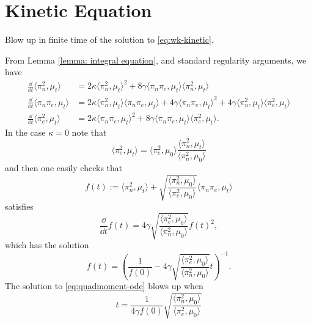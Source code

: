 \section{Kinetic Equation}

Blow up in finite time of the solution to \eqref{eq:wk-kinetic}.

From Lemma \ref{lemma: integral equation}, and standard regularity arguments, we have 
\begin{align}
    \frac{\dd}{\dd t}\langle \pi_n^2, \mu_t\rangle &=
    2\kappa \langle \pi_n^2, \mu_t\rangle^2
    + 8 \gamma \langle \pi_n \pi_e, \mu_t\rangle\langle \pi_n^2, \mu_t\rangle\\
    \frac{\dd}{\dd t}\langle \pi_n \pi_e, \mu_t\rangle &=
    2\kappa \langle \pi_n^2, \mu_t\rangle \langle \pi_n \pi_e, \mu_t\rangle
    + 4 \gamma \langle \pi_n \pi_e, \mu_t\rangle^2
    + 4 \gamma \langle \pi_n^2, \mu_t\rangle\langle \pi_e^2, \mu_t\rangle\\
    \frac{\dd}{\dd t}\langle \pi_e^2, \mu_t\rangle &=
    2\kappa \langle \pi_n \pi_e, \mu_t\rangle^2
    + 8 \gamma \langle \pi_n \pi_e, \mu_t\rangle\langle \pi_e^2, \mu_t\rangle.
\end{align}
In the case $\kappa = 0$ note that
\begin{equation}\label{eq:proportional}
    \langle \pi_e^2, \mu_t\rangle = \langle \pi_e^2, \mu_0\rangle
    \frac{\langle \pi_n^2, \mu_t\rangle}{\langle \pi_n^2, \mu_0\rangle}
\end{equation}
and then one easily checks that
\begin{equation}
    f(t) := \langle \pi_n^2, \mu_t\rangle
           + \sqrt{\frac{\langle \pi_n^2, \mu_0\rangle}
                        {\langle \pi_e^2, \mu_0\rangle}}
             \langle \pi_n \pi_e, \mu_t\rangle
\end{equation}
satisfies
\begin{equation*}
    \frac{\dd }{\dd t}f(t) = 4\gamma 
    \sqrt{\frac{\langle \pi_e^2, \mu_0\rangle}
                        {\langle \pi_n^2, \mu_0\rangle}}f(t)^2,
\end{equation*}
which has the solution
\begin{equation}\label{eq:quadmoment-ode}
    f(t) = \left(\frac{1}{f(0)} - 4\gamma 
    \sqrt{\frac{\langle \pi_e^2, \mu_0\rangle}
                        {\langle \pi_n^2, \mu_0\rangle}}t \right)^{-1}.
\end{equation}
The solution to \eqref{eq:quadmoment-ode} blows up when
\begin{equation}\label{eq:quad-tgel}
    t = \frac{1}{4\gamma f(0)}
             \sqrt{\frac{\langle \pi_n^2, \mu_0\rangle}
                        {\langle \pi_e^2, \mu_0\rangle}}
\end{equation}

